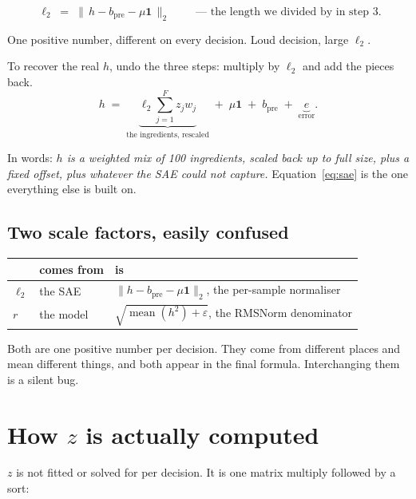 \documentclass[11pt]{article}
\newcommand{\bpre}{b_{\mathrm{pre}}}
\begin{document}
\begin{equation}
\boxed{\;\ell_2 \;=\; \bigl\| \, h - \bpre - \mu\mathbf{1} \, \bigr\|_2\;}
\qquad\text{--- the length we divided by in step 3.}
\label{eq:l2}
\end{equation}

One positive number, different on every decision. Loud decision, large $\ell_2$.

To recover the real $h$, undo the three steps: multiply by $\ell_2$ and add the pieces back.
\begin{equation}
h \;=\; \underbrace{\ell_2 \sum_{j=1}^{F} z_j w_j}_{\text{the ingredients, rescaled}}
\;+\; \mu\mathbf{1} \;+\; \bpre \;+\; \underbrace{e}_{\text{error}} .
\label{eq:sae}
\end{equation}

In words: \emph{$h$ is a weighted mix of 100 ingredients, scaled back up to full size, plus a
fixed offset, plus whatever the SAE could not capture.} Equation~\eqref{eq:sae} is the one
everything else is built on.

\subsection*{Two scale factors, easily confused}

\begin{center}
\begin{tabular}{@{}lll@{}}
\toprule
 & comes from & is \\
\midrule
$\ell_2$ & the SAE   & $\|h - \bpre - \mu\mathbf{1}\|_2$, the per-sample normaliser \\
$r$      & the model & $\sqrt{\operatorname{mean}(h^{2}) + \varepsilon}$, the RMSNorm denominator \\
\bottomrule
\end{tabular}
\end{center}

\noindent
Both are one positive number per decision. They come from different places and mean different
things, and both appear in the final formula. Interchanging them is a silent bug.

\section{How \texorpdfstring{$z$}{z} is actually computed}
\label{sec:z}

$z$ is not fitted or solved for per decision. It is one matrix multiply followed by a sort:
\end{document}

